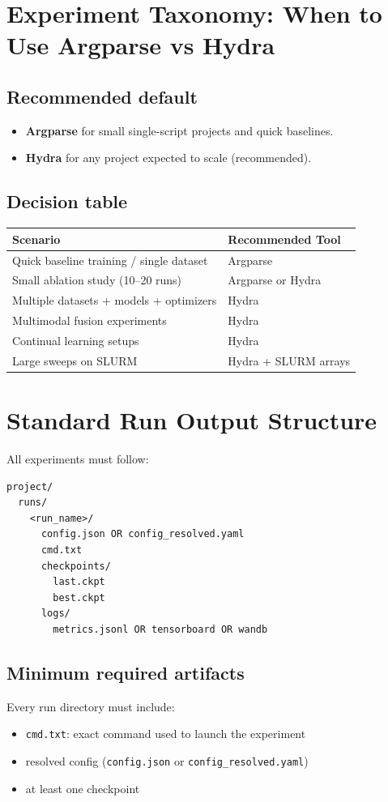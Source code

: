 \documentclass[11pt]{article}
\begin{document}
\section{Experiment Taxonomy: When to Use Argparse vs Hydra}
\subsection{Recommended default}
\begin{itemize}[nosep]
    \item \textbf{Argparse} for small single-script projects and quick baselines.
    \item \textbf{Hydra} for any project expected to scale (recommended).
\end{itemize}

\subsection{Decision table}
\begin{center}
\begin{tabular}{ll}
\toprule
\textbf{Scenario} & \textbf{Recommended Tool} \\
\midrule
Quick baseline training / single dataset & Argparse \\
Small ablation study (10--20 runs) & Argparse or Hydra \\
Multiple datasets + models + optimizers & Hydra \\
Multimodal fusion experiments & Hydra \\
Continual learning setups & Hydra \\
Large sweeps on SLURM & Hydra + SLURM arrays \\
\bottomrule
\end{tabular}
\end{center}

\section{Standard Run Output Structure}
All experiments must follow:

\begin{lstlisting}
project/
  runs/
    <run_name>/
      config.json OR config_resolved.yaml
      cmd.txt
      checkpoints/
        last.ckpt
        best.ckpt
      logs/
        metrics.jsonl OR tensorboard OR wandb
\end{lstlisting}

\subsection{Minimum required artifacts}
Every run directory must include:
\begin{itemize}[nosep]
    \item \texttt{cmd.txt}: exact command used to launch the experiment
    \item resolved config (\texttt{config.json} or \texttt{config\_resolved.yaml})
    \item at least one checkpoint
\end{itemize}
\end{document}
